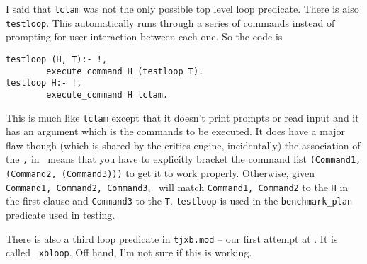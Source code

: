I said that {\tt lclam} was not the only
possible top level loop predicate.  There is
also {\tt testloop}.  This automatically runs through
a series of commands instead of prompting for user interaction between 
each one.  So the code is
\begin{verbatim}
testloop (H, T):- !,
        execute_command H (testloop T).
testloop H:- !,
        execute_command H lclam.
\end{verbatim}
This is much like {\tt lclam} except that it doesn't print prompts or
read input and it has an argument which is the commands to be
executed.  It does have a major flaw though (which is shared by the
critics engine, incidentally) the association of the
{\tt ,} in \lprolog\ means that you have to explicitly bracket the
command list {\tt (Command1, (Command2, (Command3)))} to get it to
work properly.  Otherwise, given {\tt Command1, Command2, Command3},
\lprolog\ will match {\tt Command1, Command2} to the {\tt H} in the
first clause and {\tt Command3} to the {\tt T}.  {\tt testloop} is
used in the {\tt benchmark\_plan} predicate
used in testing.

There is also a third loop predicate in {\tt tjxb.mod} -- our first attempt at \xlclam.  It is called {\tt
  xbloop}.  Off hand, I'm not sure if this is working.


